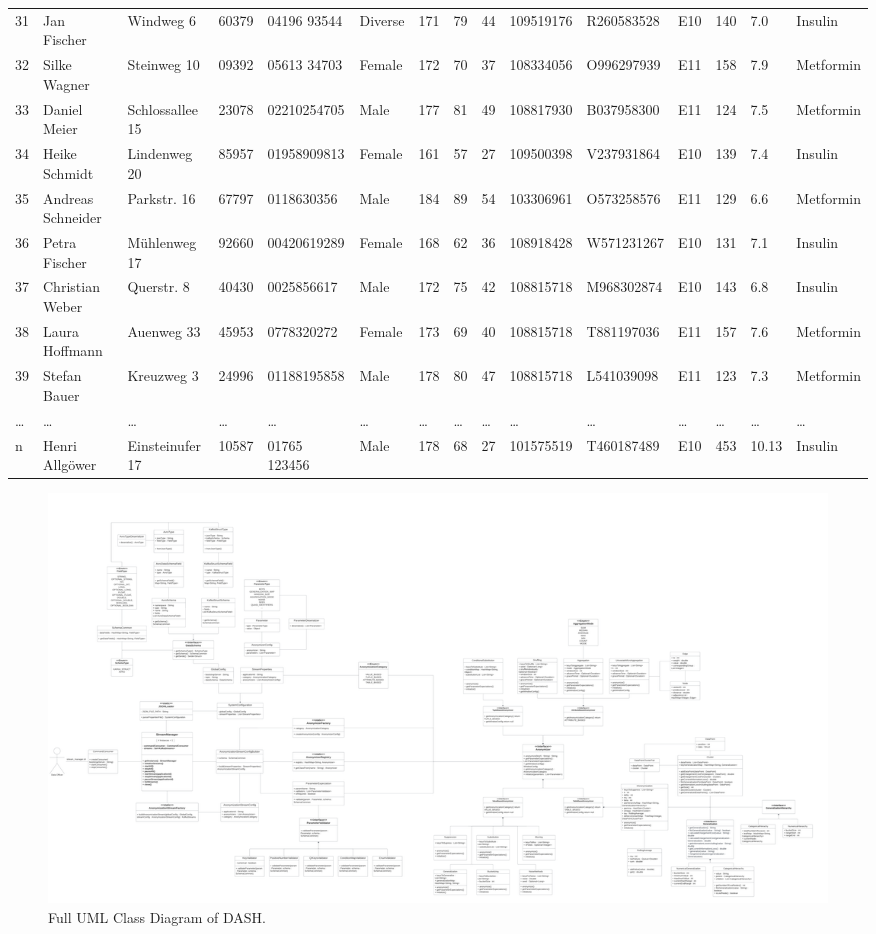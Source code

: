 \begin{table}
\begin{longtable}{lllllllllllllll}
    31 & Jan Fischer & Windweg 6 & 60379 & 04196 93544 & Diverse & 171 & 79 & 44 & 109519176 & R260583528 & E10 & 140 & 7.0 & Insulin \\
    32 & Silke Wagner & Steinweg 10 & 09392 & 05613 34703 & Female & 172 & 70 & 37 & 108334056 & O996297939 & E11 & 158 & 7.9 & Metformin \\
    33 & Daniel Meier & Schlossallee 15 & 23078 & 02210254705 & Male & 177 & 81 & 49 & 108817930 & B037958300 & E11 & 124 & 7.5 & Metformin \\
    34 & Heike Schmidt & Lindenweg 20 & 85957 & 01958909813 & Female & 161 & 57 & 27 & 109500398 & V237931864 & E10 & 139 & 7.4 & Insulin \\
    35 & Andreas Schneider & Parkstr. 16 & 67797 & 0118630356 & Male & 184 & 89 & 54 & 103306961 & O573258576 & E11 & 129 & 6.6 & Metformin \\
    36 & Petra Fischer & Mühlenweg 17 & 92660 & 00420619289 & Female & 168 & 62 & 36 & 108918428 & W571231267 & E10 & 131 & 7.1 & Insulin \\
    37 & Christian Weber & Querstr. 8 & 40430 & 0025856617 & Male & 172 & 75 & 42 & 108815718 & M968302874 & E10 & 143 & 6.8 & Insulin \\
    38 & Laura Hoffmann & Auenweg 33 & 45953 & 0778320272 & Female & 173 & 69 & 40 & 108815718 & T881197036 & E11 & 157 & 7.6 & Metformin \\
    39 & Stefan Bauer & Kreuzweg 3 & 24996 & 01188195858 & Male & 178 & 80 & 47 & 108815718 & L541039098 & E11 & 123 & 7.3 & Metformin \\
    \dots & \dots & \dots & \dots & \dots & \dots & \dots & \dots & \dots & \dots & \dots & \dots & \dots & \dots & \dots \\
    n & Henri Allgöwer & Einsteinufer 17 & 10587 & 01765 123456 & Male & 178 & 68 & 27 & 101575519 & T460187489 & E10 & 453 & 10.13 & Insulin \\

    \end{longtable}    
\end{table}

\begin{figure}
    \centering
    \includegraphics[width=\linewidth]{img/DASH_full_class_diagram.pdf}
    \caption{Full UML Class Diagram of \ac{DASH}.}
    \label{fig:full_class_diagram}
\end{figure}


